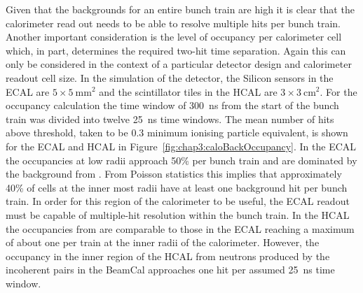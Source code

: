 Given that the backgrounds for an entire bunch train are high it is clear that
the calorimeter read out needs to be able to resolve multiple hits per bunch train. Another important consideration
is the level of occupancy per calorimeter cell which, in part, determines the
required two-hit time separation. Again this can only be considered in the 
context of a particular detector design and calorimeter readout cell size. In
the simulation of the \clicild detector, the Silicon sensors in the ECAL are
$5\times5~\mathrm{mm}^2$ and the scintillator tiles in the HCAL are 
$3\times3~\mathrm{cm}^2$. For the occupancy calculation the time
window of 300~ns from the start of the bunch train was divided into twelve
25~ns time windows. The mean number of hits above threshold, taken to be 0.3
minimum ionising particle equivalent, is shown for the ECAL and HCAL in
Figure~\ref{fig:chap3:caloBackOccupancy}. In the ECAL the occupancies at low
radii approach 50\% per bunch train and are dominated by the background from
\gghadrons. From Poisson statistics this implies that approximately 40\% of
cells at the inner most radii have at least one background hit per bunch train.
In order for this region of the calorimeter to be useful, the ECAL readout must
be capable of multiple-hit resolution within the bunch train. In the HCAL the
occupancies from \gghadrons are comparable to those in the ECAL reaching a
maximum of about one per train at the inner radii of the calorimeter. However,
the occupancy in the inner region of the HCAL from neutrons produced by the
incoherent pairs in the BeamCal approaches one hit per assumed 25~ns
time window. 


